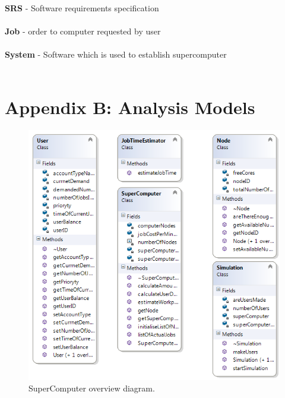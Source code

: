 \documentclass{scrreprt}
\begin{document}
\textbf{SRS }- Software requirements specification
\\
\\
\textbf{Job} - order to computer requested by user
\\
\\
\textbf{System} - Software which is used to establish supercomputer
\\
\\

\section{Appendix B: Analysis Models}

\begin{figure}[h!]
\centering
\includegraphics{ClassDiagram.png}
\caption{SuperComputer overview diagram.}

\end{figure}
\end{document}
